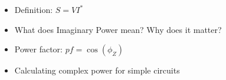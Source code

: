 \begin{itemize}
\item Definition: $S=VI^*$
\item What does Imaginary Power mean?  Why does it matter?
\item Power factor: $pf = \cos(\phi_Z)$
\item Calculating complex power for simple circuits
\end{itemize}

